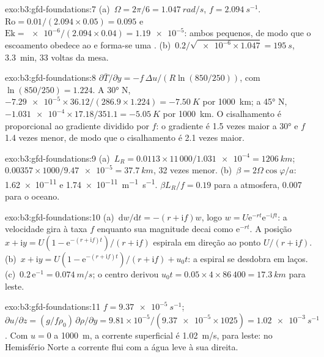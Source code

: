 \begin{solution}{exo:b3:gfd-foundations:7}
(a)~$\Omega = 2\pi/6 = \qty{1.047}{rad/s}$, $f = \qty{2.094}{s^{-1}}$.
$\mathrm{Ro} = 0.01/(2.094\times0.05) = 0.095$ e $\mathrm{Ek} =
\num{e-6}/(2.094\times0.04) = \num{1.19e-5}$: ambos pequenos, de modo que o
escoamento obedece ao  e forma-se uma . (b)~$0.2/\sqrt{\num{e-6}
\times1.047} = \qty{195}{s}$, \qty{3.3}{min}, 33 voltas da mesa.
\end{solution}

\begin{solution}{exo:b3:gfd-foundations:8}
$\partial\bar T/\partial y = -f\,\Delta u/(R\ln(850/250))$, com
$\ln(850/250) = 1.224$. A \ang{30} N, $-\num{7.29e-5}\times36.12/(286.9
\times1.224) = \qty{-7.50}{K}$ por \qty{1000}{km}; a \ang{45} N,
$-\num{1.031e-4}\times17.18/351.1 = \qty{-5.05}{K}$ por \qty{1000}{km}. O
cisalhamento é proporcional ao gradiente dividido por $f$: o gradiente é 1.5
vezes maior a \ang{30} e $f$ 1.4 vezes menor, de modo que o cisalhamento é 2.1 vezes
maior.
\end{solution}

\begin{solution}{exo:b3:gfd-foundations:9}
(a)~$L_R = 0.0113\times11\,000/\num{1.031e-4} = \qty{1206}{km}$;
$0.00357\times1000/\num{9.47e-5} = \qty{37.7}{km}$, 32 vezes menor.
(b)~$\beta = 2\Omega\cos\varphi/a$: \num{1.62e-11} e
\qty{1.74e-11}{m^{-1}.s^{-1}}. $\beta L_R/f = 0.19$ para a atmosfera, 0.007
para o oceano.
\end{solution}

\begin{solution}{exo:b3:gfd-foundations:10}
(a)~$\mathrm dw/\mathrm dt = -(r + \mathrm if)w$, logo $w = U\mathrm
e^{-rt}\mathrm e^{-\mathrm ift}$: a velocidade gira à taxa $f$ enquanto
sua magnitude decai como $\mathrm e^{-rt}$. A posição $x + \mathrm iy =
U(1 - \mathrm e^{-(r + \mathrm if)t})/(r + \mathrm if)$ espirala em direção ao
ponto $U/(r + \mathrm if)$. (b)~$x + \mathrm iy = U(1 - \mathrm e^{-(r +
\mathrm if)t})/(r + \mathrm if) + u_0t$: a espiral se desdobra em laços.
(c)~$0.2\,\mathrm e^{-1} = \qty{0.074}{m/s}$; o centro derivou $u_0t =
0.05\times4\times86\,400 = \qty{17.3}{km}$ para leste.
\end{solution}

\begin{solution}{exo:b3:gfd-foundations:11}
$f = \qty{9.37e-5}{s^{-1}}$; $\partial u/\partial z = (g/f\rho_0)\,\partial
\rho/\partial y = 9.81\times10^{-5}/(\num{9.37e-5}\times1025) =
\qty{1.02e-3}{s^{-1}}$. Com $u = 0$ a \qty{1000}{m}, a corrente superficial é
\qty{1.02}{m/s}, para leste: no Hemisfério Norte a corrente flui com a água
leve à sua direita.
\end{solution}

